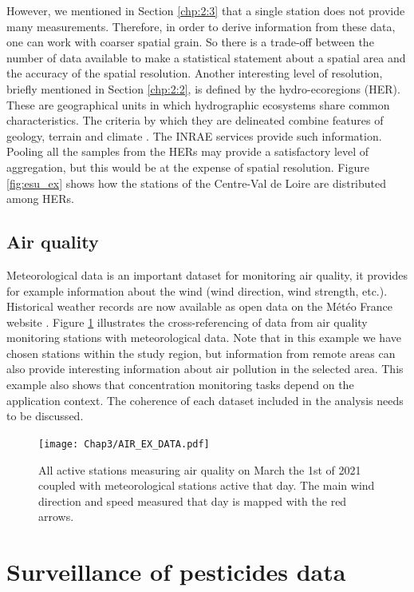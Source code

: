 However, we mentioned in Section \ref{chp:2:3} that a single station does not provide many measurements. Therefore, in order to derive information from these data, one can work with coarser spatial grain. So there is a trade-off between the number of data available to make a statistical statement about a spatial area and the accuracy of the spatial resolution. Another interesting level of resolution, briefly mentioned in Section \ref{chp:2:2}, is defined by the hydro-ecoregions (HER). These are geographical units in which hydrographic ecosystems share common characteristics. The criteria by which they are delineated combine features of geology, terrain and climate \citep{wasson:hal-02580774}. The INRAE services provide such information. Pooling all the samples from the HERs may provide a satisfactory level of aggregation, but this would be at the expense of spatial resolution. Figure \ref{fig:esu_ex} shows how the stations of the Centre-Val de Loire are distributed among HERs.

\subsection{Air quality}
Meteorological data is an important dataset for monitoring air quality, it provides for example information about the wind (wind direction, wind strength, etc.). Historical weather records are now available as open data on the Météo France website \cite{SYNOP}. Figure \ref{fig:air_ex} illustrates the cross-referencing of data from air quality monitoring stations with meteorological data. Note that in this example we have chosen stations within the study region, but information from remote areas can also provide interesting information about air pollution in the selected area. This example also shows that concentration monitoring tasks depend on the application context. The coherence of each dataset included in the analysis needs to be discussed.

\begin{figure}[ht]
    \centering
    \texttt{[image: Chap3/AIR\_EX\_DATA.pdf]}
    \caption{All active stations measuring air quality on March the 1st of 2021 coupled with meteorological stations active that day. The main wind direction and speed measured that day is mapped with the red arrows.}
    \label{fig:air_ex}
\end{figure}

\section{Surveillance of pesticides data}\label{chp:2:5}

